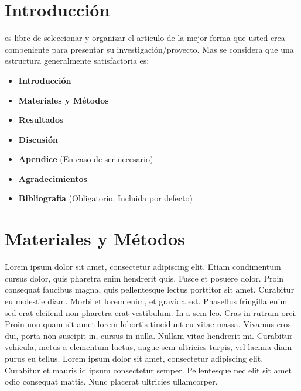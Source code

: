 \documentclass[colTwo]{NanouparIEEE}
\begin{document}
    \section{Introducción}
         es libre de seleccionar y organizar el articulo de la mejor forma que usted crea combeniente para presentar su investigación/proyecto. Mas se considera que una estructura generalmente satisfactoria es:

        \begin{itemize}
            \item \textbf{Introducción}
            \item \textbf{Materiales y Métodos}
            \item \textbf{Resultados}
            \item \textbf{Discusión}
            \item \textbf{Apendice} (En caso de ser necesario)
            \item \textbf{Agradecimientos}
            \item \textbf{Bibliografia} (Obligatorio, Incluida por defecto)
        \end{itemize}

    \section{Materiales y Métodos}
        Lorem ipsum dolor sit amet, consectetur adipiscing elit. Etiam condimentum cursus dolor, quis pharetra enim hendrerit quis. Fusce et posuere dolor. Proin consequat faucibus magna, quis pellentesque lectus porttitor sit amet. Curabitur eu molestie diam. Morbi et lorem enim, et gravida est. Phasellus fringilla enim sed erat eleifend non pharetra erat vestibulum. In a sem leo. Cras in rutrum orci. Proin non quam sit amet lorem lobortis tincidunt eu vitae massa. Vivamus eros dui, porta non suscipit in, cursus in nulla. Nullam vitae hendrerit mi. Curabitur vehicula, metus a elementum luctus, augue sem ultricies turpis, vel lacinia diam purus eu tellus. Lorem ipsum dolor sit amet, consectetur adipiscing elit. Curabitur et mauris id ipsum consectetur semper. Pellentesque nec elit sit amet odio consequat mattis. Nunc placerat ultricies ullamcorper.
\end{document}
